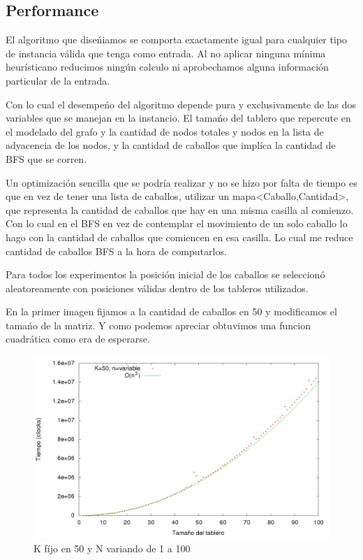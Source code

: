 \subsection{Performance}

El algoritmo que dise\'niamos se comporta exactamente igual para cualquier tipo de instancia v\'alida que tenga como entrada. Al no aplicar ninguna m\'inima heur\'isticano reducimos ning\'un calculo ni aprobechamos alguna informaci\'on particular de la entrada.

Con lo cual el desempe\'no del algoritmo depende pura y exclusivamente de las dos variables que se manejan en la instancio. El tama\'no del tablero que repercute en el modelado del grafo y la cantidad de nodos totales y nodos en la lista de adyacencia de los nodos, y la cantidad de caballos que impl\'ica la cantidad de BFS que se corren.

Un optimizaci\'on sencilla que se podr\'ia realizar y no se hizo por falta de tiempo es que en vez de tener una lista de caballos, utilizar un mapa<Caballo,Cantidad>, que representa la cantidad de caballos que hay en una misma casilla al comienzo.
Con lo cual en el BFS en vez de contemplar el movimiento de un solo caballo lo hago con la cantidad de caballos que comiencen en esa casilla. Lo cual me reduce cantidad de caballos BFS a la hora de computarlos.

Para todos los experimentos la posici\'on inicial de los caballos se seleccion\'o aleatoreamente con posiciones v\'alidas dentro de los tableros utilizados.


En la primer imagen fijamos a la cantidad de caballos en 50 y modificamos el tama\'no de la matriz. Y como podemos apreciar obtuvimos una funcion cuadr\'atica como era de esperarse.

\begin{figure}[H]
\begin{center}
\includegraphics[scale=0.35]{./imagenes/ej2_chartRendimiento.png}
\caption{K f\'ijo en 50 y N variando de 1 a 100}
\end{center}
\end{figure}

